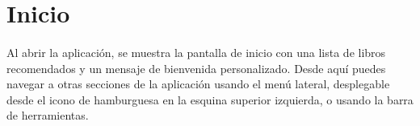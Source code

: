 \documentclass[a4paper,12pt]{report}
\begin{document}
    \section{Inicio}
      \begin{minipage}{0.6\textwidth}
        \paragraph*{}{
          Al abrir la aplicación, se muestra la pantalla de inicio con una lista de libros recomendados y un mensaje de bienvenida personalizado. Desde aquí puedes navegar a otras secciones de la aplicación usando el menú lateral, desplegable desde el icono de hamburguesa en la esquina superior izquierda, o usando la barra de herramientas.
        }      
      \end{minipage}
      \hfill
\end{document}

